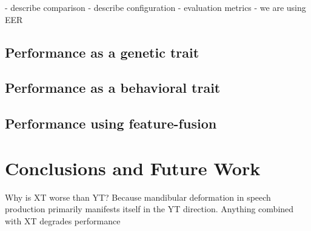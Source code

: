 \documentclass[a4paper, 10pt, conference]{ieeeconf}      %
\begin{document}
- describe comparison
- describe configuration
- evaluation metrics - we are using EER



\subsection{Performance as a genetic trait}

\subsection{Performance as a behavioral trait}

\subsection{Performance using feature-fusion}

\section{Conclusions and Future Work}

Why is XT worse than YT? Because mandibular deformation in speech production primarily manifests itself in the YT direction. 
Anything combined with XT degrades performance
\label{Conclusions}
 



\end{document}

